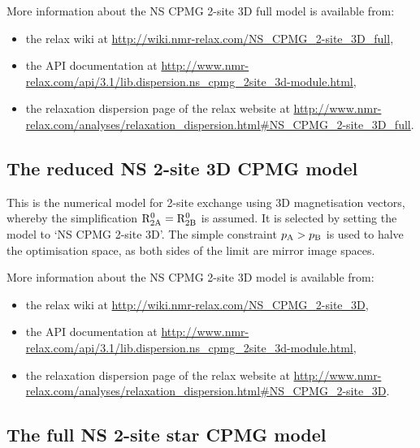 More information about the NS CPMG 2-site 3D full model is available from:
\begin{itemize}
  \item the relax wiki at \url{http://wiki.nmr-relax.com/NS\_CPMG\_2-site\_3D\_full},
  \item the API documentation at \url{http://www.nmr-relax.com/api/3.1/lib.dispersion.ns\_cpmg\_2site\_3d-module.html},
  \item the relaxation dispersion page of the relax website at \url{http://www.nmr-relax.com/analyses/relaxation\_dispersion.html#NS\_CPMG\_2-site\_3D\_full}.
\end{itemize}



\subsection{The reduced NS 2-site 3D CPMG model}
\label{sect: dispersion: NS CPMG 2-site 3D model}

This is the numerical model for 2-site exchange using 3D magnetisation vectors, whereby the simplification $\mathrm{R}_\mathrm{2A}^0 = \mathrm{R}_\mathrm{2B}^0$ is assumed.
It is selected by setting the model to `NS CPMG 2-site 3D'.
The simple constraint $p_\textrm{A} > p_\textrm{B}$ is used to halve the optimisation space, as both sides of the limit are mirror image spaces.

More information about the NS CPMG 2-site 3D model is available from:
\begin{itemize}
  \item the relax wiki at \url{http://wiki.nmr-relax.com/NS\_CPMG\_2-site\_3D},
  \item the API documentation at \url{http://www.nmr-relax.com/api/3.1/lib.dispersion.ns\_cpmg\_2site\_3d-module.html},
  \item the relaxation dispersion page of the relax website at \url{http://www.nmr-relax.com/analyses/relaxation\_dispersion.html#NS\_CPMG\_2-site\_3D}.
\end{itemize}



\subsection{The full NS 2-site star CPMG model}
\label{sect: dispersion: NS CPMG 2-site star full model}

